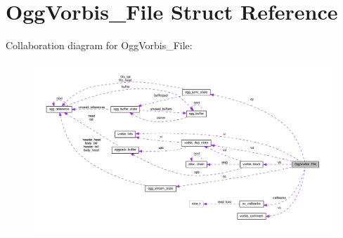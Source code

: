 \hypertarget{structOggVorbis__File}{}\section{Ogg\+Vorbis\+\_\+\+File Struct Reference}
\label{structOggVorbis__File}


Collaboration diagram for Ogg\+Vorbis\+\_\+\+File\+:
\nopagebreak
\begin{figure}[H]
\begin{center}
\leavevmode
\includegraphics[width=350pt]{structOggVorbis__File__coll__graph}
\end{center}
\end{figure}
